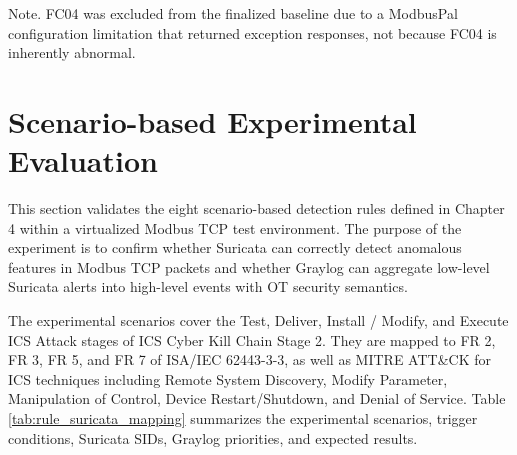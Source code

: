 \begin{table}[htbp]
\caption{Baseline traffic validation result}
\centering
\renewcommand{\arraystretch}{1.35}
\setlength{\tabcolsep}{6pt}
\label{tab:baseline_traffic_validation}
\end{table}

Note. FC04 was excluded from the finalized baseline due to a ModbusPal configuration limitation that returned exception responses, not because FC04 is inherently abnormal.

\newpage

\section{Scenario-based Experimental Evaluation}
This section validates the eight scenario-based detection rules defined in Chapter 4 within a virtualized Modbus TCP test environment. The purpose of the experiment is to confirm whether Suricata can correctly detect anomalous features in Modbus TCP packets and whether Graylog can aggregate low-level Suricata alerts into high-level events with OT security semantics.

The experimental scenarios cover the Test, Deliver, Install / Modify, and Execute ICS Attack stages of ICS Cyber Kill Chain Stage 2. They are mapped to FR 2, FR 3, FR 5, and FR 7 of ISA/IEC 62443-3-3, as well as MITRE ATT\&CK for ICS techniques including Remote System Discovery, Modify Parameter, Manipulation of Control, Device Restart/Shutdown, and Denial of Service. Table \ref{tab:rule_suricata_mapping} summarizes the experimental scenarios, trigger conditions, Suricata SIDs, Graylog priorities, and expected results.

